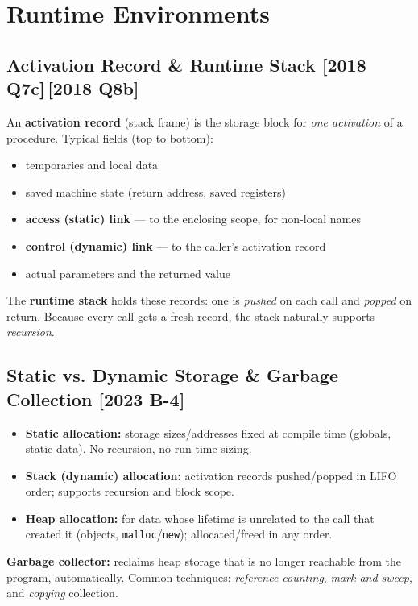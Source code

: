 \documentclass[12pt, a4paper]{article}
\newenvironment{qbox}{\begin{mdframed}[style=qframe]}{\end{mdframed}}
\newcommand{\yr}[1]{{\small\color{accent}\textbf{[#1]}}}
\newcommand{\term}[1]{\textbf{\color{keyblue}#1}}
\begin{document}
\section{Runtime Environments}

\subsection{Activation Record \& Runtime Stack \yr{2018 Q7c}\,\yr{2018 Q8b}}
\begin{qbox}
An \term{activation record} (stack frame) is the storage block for \emph{one activation} of a procedure. Typical fields
(top to bottom):
\begin{itemize}
\item temporaries and local data
\item saved machine state (return address, saved registers)
\item \term{access (static) link} — to the enclosing scope, for non-local names
\item \term{control (dynamic) link} — to the caller's activation record
\item actual parameters and the returned value
\end{itemize}
The \term{runtime stack} holds these records: one is \emph{pushed} on each call and \emph{popped} on return. Because every
call gets a fresh record, the stack naturally supports \emph{recursion}.
\end{qbox}

\subsection{Static vs. Dynamic Storage \& Garbage Collection \yr{2023 B-4}}
\begin{qbox}
\begin{itemize}
\item \term{Static allocation:} storage sizes/addresses fixed at compile time (globals, static data). No recursion, no run-time sizing.
\item \term{Stack (dynamic) allocation:} activation records pushed/popped in LIFO order; supports recursion and block scope.
\item \term{Heap allocation:} for data whose lifetime is unrelated to the call that created it (objects, \texttt{malloc}/\texttt{new}); allocated/freed in any order.
\end{itemize}
\term{Garbage collector:} reclaims heap storage that is no longer reachable from the program, automatically. Common
techniques: \emph{reference counting}, \emph{mark-and-sweep}, and \emph{copying} collection.
\end{qbox}
\end{document}
